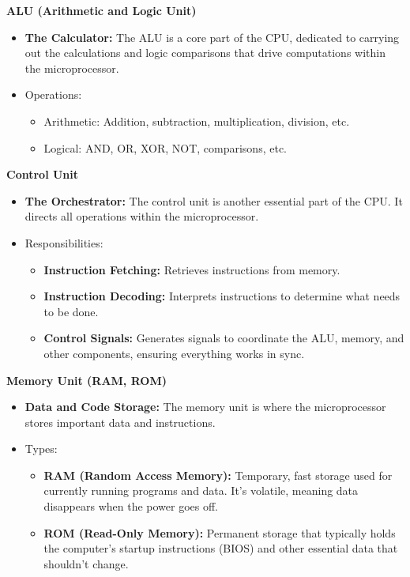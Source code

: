 \documentclass[
]{article}
\begin{document}
\textbf{ALU (Arithmetic and Logic Unit)}

\begin{itemize}
\item
  \textbf{The Calculator:} The ALU is a core part of the CPU, dedicated
  to carrying out the calculations and logic comparisons that drive
  computations within the microprocessor.
\item
  Operations:

  \begin{itemize}
  \item
    Arithmetic: Addition, subtraction, multiplication, division, etc.
  \item
    Logical: AND, OR, XOR, NOT, comparisons, etc.
  \end{itemize}
\end{itemize}

\textbf{Control Unit}

\begin{itemize}
\item
  \textbf{The Orchestrator:} The control unit is another essential part
  of the CPU. It directs all operations within the microprocessor.
\item
  Responsibilities:

  \begin{itemize}
  \item
    \textbf{Instruction Fetching:} Retrieves instructions from memory.
  \item
    \textbf{Instruction Decoding:} Interprets instructions to determine
    what needs to be done.
  \item
    \textbf{Control Signals:} Generates signals to coordinate the ALU,
    memory, and other components, ensuring everything works in sync.
  \end{itemize}
\end{itemize}

\textbf{Memory Unit (RAM, ROM)}

\begin{itemize}
\item
  \textbf{Data and Code Storage:} The memory unit is where the
  microprocessor stores important data and instructions.
\item
  Types:

  \begin{itemize}
  \item
    \textbf{RAM (Random Access Memory):} Temporary, fast storage used
    for currently running programs and data. It's volatile, meaning data
    disappears when the power goes off.
  \item
    \textbf{ROM (Read-Only Memory):} Permanent storage that typically
    holds the computer's startup instructions (BIOS) and other essential
    data that shouldn't change.
  \end{itemize}
\end{itemize}
\end{document}
